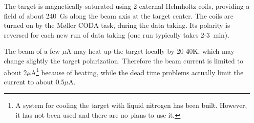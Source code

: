 {The target is magnetically saturated using 2 external
Helmholtz coils, providing a field of about 240~Gs along the beam
axis at the target center. The coils are turned on by the M{\o}ller 
CODA task, during the data taking. Its polarity is reversed for each new
run of data taking (one run typically takes 2-3~min).

\begin{safetyen}{20}{20}
The beam of a few $\mu$A may heat up the target locally by 20-40K,
which may change slightly the target polarization. Therefore
the beam current is limited to about 2$\mu$A\footnote{ 
A system for cooling the target with liquid nitrogen has been built. 
However, it has not been used and there are no plans to use it.}
because of heating, while the dead time problems actually
limit the current to about 0.5$\mu$A.
\end{safetyen}

}

